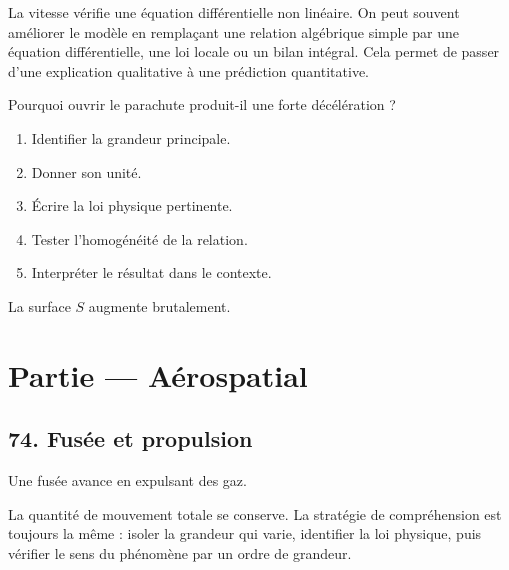 \documentclass[11pt,a4paper]{article}
\begin{document}
\begin{approfondissementbox}
La vitesse vérifie une équation différentielle non linéaire.
On peut souvent améliorer le modèle en remplaçant une relation algébrique simple par une équation différentielle, une loi locale ou un bilan intégral. Cela permet de passer d'une explication qualitative à une prédiction quantitative.
\end{approfondissementbox}

\begin{exercicebox}
Pourquoi ouvrir le parachute produit-il une forte décélération ?
\begin{enumerate}
  \item Identifier la grandeur principale.
  \item Donner son unité.
  \item Écrire la loi physique pertinente.
  \item Tester l'homogénéité de la relation.
  \item Interpréter le résultat dans le contexte.
\end{enumerate}
\end{exercicebox}

\begin{corrigebox}[Indication]
La surface $S$ augmente brutalement.
\end{corrigebox}


\section{Partie — Aérospatial}


\subsection{74. Fusée et propulsion}

\begin{exemplebox}
Une fusée avance en expulsant des gaz.
\end{exemplebox}

\begin{methodebox}
La quantité de mouvement totale se conserve.
La stratégie de compréhension est toujours la même : isoler la grandeur qui varie, identifier la loi physique, puis vérifier le sens du phénomène par un ordre de grandeur.
\end{methodebox}
\end{document}
